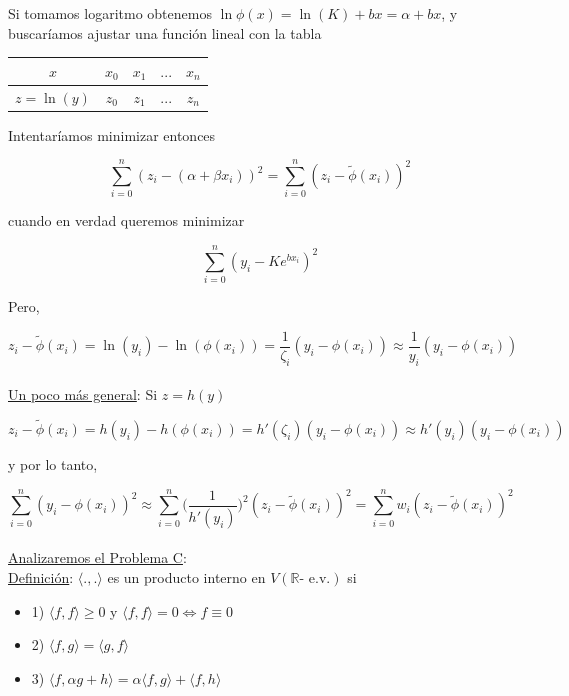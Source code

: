Si tomamos logaritmo obtenemos $\ln \phi(x) = \ln(K) + bx = \alpha + bx$, y buscar\'iamos ajustar una funci\'on lineal con la tabla

\begin{table}[ht]
    \centering
    \begin{tabular}{|c|c|c|c|c|}
        \hline
        $x$ & $x_{0}$ & $x_{1}$ & $...$ & $x_{n}$\\ \hline
        $z = \ln(y)$ & $z_{0}$ & $z_{1}$ & $...$ & $z_{n}$\\ \hline
    \end{tabular}
\end{table}

Intentar\'iamos minimizar entonces 

$$\sum \limits_{i = 0}^{n} (z_{i} - (\alpha + \beta x_{i}))^{2} = \sum \limits_{i = 0}^{n} (z_{i} - \tilde{\phi}(x_{i}))^{2}$$

cuando en verdad queremos minimizar

$$\sum \limits_{i = 0}^{n} (y_{i} - Ke^{bx_{i}})^{2}$$

Pero,

$$z_{i} - \tilde{\phi}(x_{i}) = \ln(y_{i}) - \ln(\phi(x_{i})) = \frac{1}{\zeta_{i}}(y_{i} - \phi(x_{i})) \approx \frac{1}{y_{i}}(y_{i} - \phi(x_{i}))$$\\

\underline{Un poco m\'as general}: Si $z = h(y)$

$$z_{i} - \tilde{\phi}(x_{i}) = h(y_{i}) - h(\phi(x_{i})) = h'(\zeta_{i})(y_{i} - \phi(x_{i})) \approx h'(y_{i})(y_{i} - \phi(x_{i}))$$

y por lo tanto,

$$\sum \limits_{i = 0}^{n} (y_{i} - \phi(x_{i}))^{2} \approx \sum \limits_{i = 0}^{n} \bigg(\frac{1}{h'(y_{i})}\bigg)^{2}(z_{i} - \tilde{\phi}(x_{i}))^{2} = \sum \limits_{i = 0}^{n} w_{i}(z_{i} - \tilde{\phi}(x_{i}))^{2}$$\\

\underline{Analizaremos el Problema C}:\\

\underline{Definici\'on}: $\langle ., . \rangle$ es un producto interno en $V (\mathbb{R} \text{- e.v.})$ si

\begin{itemize}
	\item 1) $\langle f, f \rangle \geq 0$ y $\langle f, f \rangle = 0 \iff f \equiv 0$
	\item 2) $\langle f, g \rangle = \langle g, f \rangle$
	\item 3) $\langle f, \alpha g + h \rangle = \alpha \langle f, g \rangle + \langle f, h \rangle$
\end{itemize}

